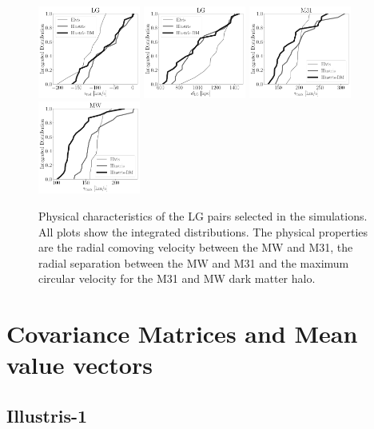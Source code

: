 \documentclass[a4paper,fleqn,usenatbib]{mnras}
\begin{document}
\begin{figure}
\centering
\includegraphics[width=0.30\textwidth]{int_distro_LG_v_rad.pdf}
\includegraphics[width=0.30\textwidth]{int_distro_LG_d.pdf}
\includegraphics[width=0.30\textwidth]{int_distro_M31_vmax.pdf}
\includegraphics[width=0.30\textwidth]{int_distro_MW_vmax.pdf}
\caption{Physical characteristics of the LG pairs selected in the
  simulations. All plots show the integrated distributions. The
  physical properties are the radial comoving velocity between the MW
  and M31, the radial separation between the MW and M31 and the
  maximum circular velocity for the M31 and MW dark matter halo.
\label{fig:physical}}
\end{figure}



\section{Covariance Matrices and Mean value vectors}
\label{appendix:covariance}
\subsection{Illustris-1}
\end{document}
